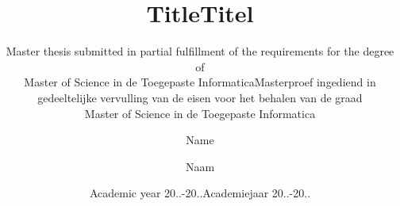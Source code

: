 \documentclass[a4paper,12pt]{book}
\author{Name}
\title{Title}
\subtitle{Master thesis submitted in partial fulfillment of the requirements for the degree of \\Master of Science in de Toegepaste Informatica}
\date{Academic year 20..-20..}
\renewcommand{\headrulewidth}{0pt}%
\begin{document}
\pagestyle{fancy}
\setlength{\headheight}{14.5pt}
\renewcommand{\chaptermark}[1]{\markboth{\MakeUppercase{\chaptername}\ \thechapter.\ #1}{}}
\renewcommand{\sectionmark}[1]{\markright{#1}{}}
\fancyhf{}
\fancyhead[LO,RE]{\bfseries\thepage}
\fancyhead[RO]{\bfseries\leftmark}
\fancyhead[LE]{\bfseries\rightmark}
\renewcommand{\headrulewidth}{0.5pt}


\maketheses

\pagebreak
\author{Naam}
\title{Titel}
\subtitle{Masterproef ingediend in gedeeltelijke vervulling van de eisen voor het behalen van de graad\\Master of Science in de Toegepaste Informatica}
\date{Academiejaar 20..-20..}

\maketheses
\pagebreak
\setcounter{page}{1}


\newpage

\newpage

\newpage
 
 

\tableofcontents
\newpage
\listoffigures
\newpage
\listoftables
\newpage
\setcounter{page}{1}



 

\newpage
\appendix
\renewcommand{\chaptermark}[1]{\markboth{\MakeUppercase{\appendixname}\ \thechapter.\ #1}{}}



\end{document}
